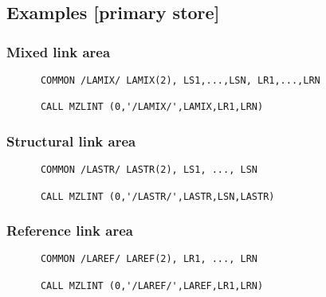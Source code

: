 \subsection{Examples [primary store]}
\subsubsection{Mixed link area}
\begin{verbatim}
      COMMON /LAMIX/ LAMIX(2), LS1,...,LSN, LR1,...,LRN
 
      CALL MZLINT (0,'/LAMIX/',LAMIX,LR1,LRN)
\end{verbatim}
\subsubsection{Structural link area}
\begin{verbatim}
      COMMON /LASTR/ LASTR(2), LS1, ..., LSN
 
      CALL MZLINT (0,'/LASTR/',LASTR,LSN,LASTR)
\end{verbatim}
\subsubsection{Reference link area}
\begin{verbatim}
      COMMON /LAREF/ LAREF(2), LR1, ..., LRN
 
      CALL MZLINT (0,'/LAREF/',LAREF,LR1,LRN)
\end{verbatim}
